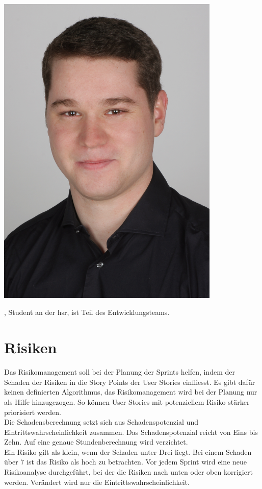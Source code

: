 \begin{minipage}[t]{0.25\textwidth}
        \vspace{0pt}
	\includegraphics[width=0.8\textwidth]{img/fabian}
\end{minipage}
\begin{minipage}[t]{0.75\textwidth}
	\vspace{0pt}
	\fbi, Student an der \gls{hsr}, ist Teil des Entwicklungsteams.
\end{minipage}

\section{Risiken}
Das Risikomanagement soll bei der Planung der Sprints helfen, indem der Schaden der Risiken in die Story Points der User Stories einfliesst. Es gibt dafür keinen definierten Algorithmus, das Risikomanagement wird bei der Planung nur als Hilfe hinzugezogen. So können User Stories mit potenziellem Risiko stärker priorisiert werden.\\
Die Schadensberechnung setzt sich aus Schadenspotenzial und Eintrittswahrscheinlichkeit zusammen. Das Schadenspotenzial reicht von Eins bis Zehn. Auf eine genaue Stundenberechnung wird verzichtet.\\
Ein Risiko gilt als klein, wenn der Schaden unter Drei liegt. Bei einem Schaden über 7 ist das Risiko als hoch zu betrachten. Vor jedem Sprint wird eine neue Risikoanalyse durchgeführt, bei der die Risiken nach unten oder oben korrigiert werden. Verändert wird nur die Eintrittswahrscheinlichkeit.

